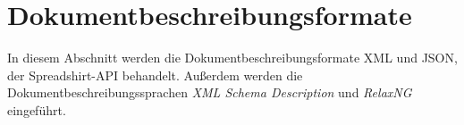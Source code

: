 \section{Dokumentbeschreibungsformate}

In diesem Abschnitt werden die Dokumentbeschreibungsformate \gls{XML} und \gls{JSON}, der Spreadshirt-API behandelt. Außerdem werden die Dokumentbeschreibungssprachen \emph{XML Schema Description} und \emph{RelaxNG} eingeführt.






